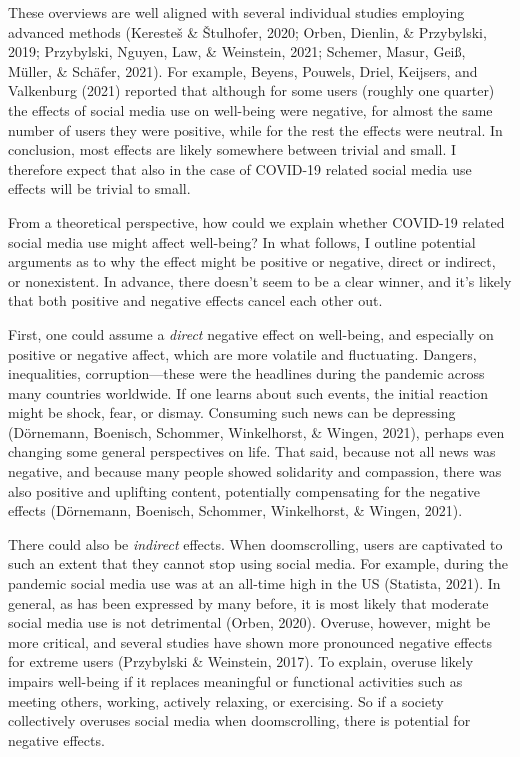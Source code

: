 \documentclass[
  english,
  man,floatsintext]{apa6}
\begin{document}
These overviews are well aligned with several individual studies employing advanced methods (Keresteš \& Štulhofer, 2020; Orben, Dienlin, \& Przybylski, 2019; Przybylski, Nguyen, Law, \& Weinstein, 2021; Schemer, Masur, Geiß, Müller, \& Schäfer, 2021).
For example, Beyens, Pouwels, Driel, Keijsers, and Valkenburg (2021) reported that although for some users (roughly one quarter) the effects of social media use on well-being were negative, for almost the same number of users they were positive, while for the rest the effects were neutral.
In conclusion, most effects are likely somewhere between trivial and small.
I therefore expect that also in the case of COVID-19 related social media use effects will be trivial to small.

From a theoretical perspective, how could we explain whether COVID-19 related social media use might affect well-being?
In what follows, I outline potential arguments as to why the effect might be positive or negative, direct or indirect, or nonexistent.
In advance, there doesn't seem to be a clear winner, and it's likely that both positive and negative effects cancel each other out.

First, one could assume a \emph{direct} negative effect on well-being, and especially on positive or negative affect, which are more volatile and fluctuating.
Dangers, inequalities, corruption---these were the headlines during the pandemic across many countries worldwide.
If one learns about such events, the initial reaction might be shock, fear, or dismay.
Consuming such news can be depressing (Dörnemann, Boenisch, Schommer, Winkelhorst, \& Wingen, 2021), perhaps even changing some general perspectives on life.
That said, because not all news was negative, and because many people showed solidarity and compassion, there was also positive and uplifting content, potentially compensating for the negative effects (Dörnemann, Boenisch, Schommer, Winkelhorst, \& Wingen, 2021).

There could also be \emph{indirect} effects.
When doomscrolling, users are captivated to such an extent that they cannot stop using social media.
For example, during the pandemic social media use was at an all-time high in the US (Statista, 2021).
In general, as has been expressed by many before, it is most likely that moderate social media use is not detrimental (Orben, 2020).
Overuse, however, might be more critical, and several studies have shown more pronounced negative effects for extreme users (Przybylski \& Weinstein, 2017).
To explain, overuse likely impairs well-being if it replaces meaningful or functional activities such as meeting others, working, actively relaxing, or exercising.
So if a society collectively overuses social media when doomscrolling, there is potential for negative effects.
\end{document}
